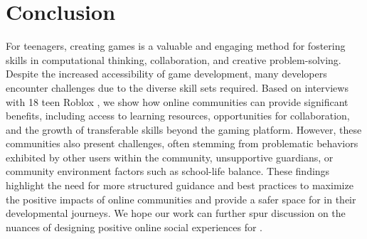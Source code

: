 \section{Conclusion}

For teenagers, creating games is a valuable and engaging method for fostering skills in computational thinking, collaboration, and creative problem-solving. Despite the increased accessibility of game development, many  developers encounter challenges due to the diverse skill sets required. Based on interviews with 18 teen Roblox , we show how online communities can provide significant benefits, including access to learning resources, opportunities for collaboration, and the growth of transferable skills beyond the gaming platform. However, these communities also present challenges, often stemming from problematic behaviors exhibited by other users within the community, unsupportive guardians, or community environment factors such as school-life balance. These findings highlight the need for more structured guidance and best practices to maximize the positive impacts of online communities and provide a safer space for  in their developmental journeys. We hope our work can further spur discussion on the nuances of designing positive online social experiences for . 

